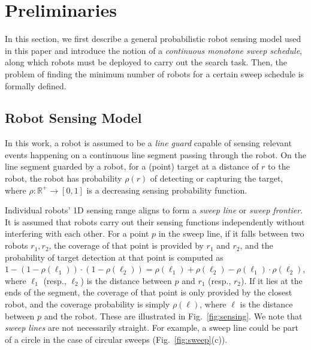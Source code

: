 
\section{Preliminaries}

In this section, we first describe a general probabilistic robot sensing model 
used in this paper and introduce the notion of a \emph{continuous monotone 
sweep schedule}, along which robots must be deployed to carry out the 
search task. 
%
Then, the problem of finding the minimum number of robots for a certain 
sweep schedule is formally defined.

\subsection{Robot Sensing Model}
\label{sec:sensing}

In this work, a robot is assumed to be a \emph{line guard} capable of sensing 
relevant events happening on a continuous line segment passing through the
robot. 
%
On the line segment guarded by a robot, for a (point) target at a distance 
of $r$ to the robot, the robot has probability $\rho(r)$ of 
detecting or capturing the target, where $\rho: \mathbb{R}^+\rightarrow[0,1]$ 
is a decreasing sensing probability function. 
%

Individual robots' 1D sensing range aligns to form a \emph{sweep line} or \emph{sweep frontier}.
%
It is assumed that robots carry out their sensing functions independently 
without interfering with each other.
%
For a point $p$ in the sweep line, if it falls between two robots $r_1, 
r_2$, the coverage of that point is provided by $r_1$ and $r_2$, and the 
probability of target detection at that point is computed as $1-(1-\rho(\ell_1))\cdot(1-\rho(\ell_2))=\rho(\ell_1) + \rho(\ell_2) - \rho(\ell_1) \cdot \rho(\ell_2)$, where $\ell_1$ (resp., $\ell_2$) is the distance between $p$ and $r_1$ (resp., $r_2$).
%
If it lies at the ends of the segment, the coverage of that point is only provided by the closest robot, and the coverage probability is simply $\rho(\ell)$, where $\ell$ is the distance between $p$ and the robot. These are illustrated in Fig.~\ref{fig:sensing}.
%
We note that \emph{sweep lines} are not necessarily straight. For example, a sweep line could be part of a circle in the case of circular sweeps (Fig.~\ref{fig:sweep}(c)).

